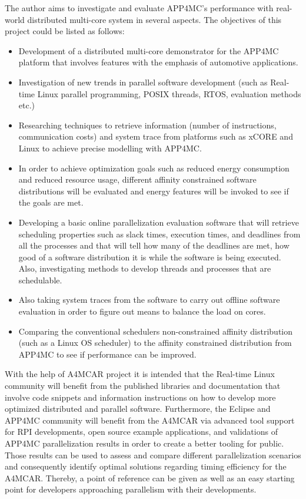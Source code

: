 The author aims to investigate and evaluate APP4MC's performance with real-world distributed multi-core system in several aspects. The objectives of this project could be listed as follows:
\begin{itemize}
	\item Development of a distributed multi-core demonstrator for the APP4MC platform that involves features with the emphasis of automotive applications.
	\item Investigation of new trends in parallel software development (such as Real-time Linux parallel programming, POSIX threads, RTOS, evaluation methods etc.)
	\item Researching techniques to retrieve information (number of instructions, communication costs) and system trace from platforms such as xCORE and Linux to achieve precise modelling with APP4MC.
	\item In order to achieve optimization goals such as reduced energy consumption and reduced resource usage, different affinity constrained software distributions will be evaluated and energy features will be invoked to see if the goals are met.
	\item Developing a basic online parallelization evaluation software that will retrieve scheduling properties such as slack times, execution times, and deadlines from all the processes and that will tell how many of the deadlines are met, how good of a software distribution it is while the software is being executed. Also, investigating methods to develop threads and processes that are schedulable.
	\item Also taking system traces from the software to carry out offline software evaluation in order to figure out means to balance the load on cores.
	\item Comparing the conventional schedulers non-constrained affinity distribution (such as a Linux OS scheduler) to the affinity constrained distribution from APP4MC to see if performance can be improved.
\end{itemize}

With the help of A4MCAR project it is intended that the Real-time Linux community will benefit from the published libraries and documentation that involve code snippets and information instructions on how to develop more optimized distributed and parallel software. Furthermore, the Eclipse and APP4MC community will benefit from the A4MCAR via advanced tool support for RPI developments, open source example applications, and validations of APP4MC parallelization results in order to create a better tooling for public. Those results can be used to assess and compare different parallelization scenarios and consequently identify optimal solutions regarding timing efficiency for the A4MCAR. Thereby, a point of reference can be given as well as an easy starting point for developers approaching parallelism with their developments. 

